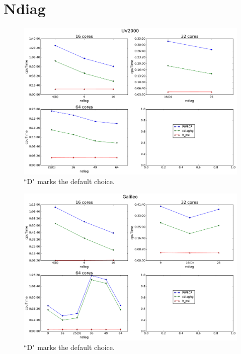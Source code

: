 \documentclass[a4paper,12pt]{article}
\begin{document}
\begin{appendices}
\newpage

~

\newpage

\section{Ndiag}\label{app:ndiag}

\begin{figure}[hhh!]
	\centerline{\includegraphics[width=1.2\linewidth]{sgi_ndiag.pdf}}
	\caption{``D" marks the default choice.
	}
	\label{fig:ndiagSgi}

\end{figure}
\newpage
\begin{figure}[hhh!]
	\centerline{\includegraphics[width=1.2\linewidth]{cineca_ndiag.pdf}}
	\caption{ ``D" marks the default choice.
	}
	\label{fig:ndiagCineca}


\end{figure}
\end{appendices}
\end{document}
